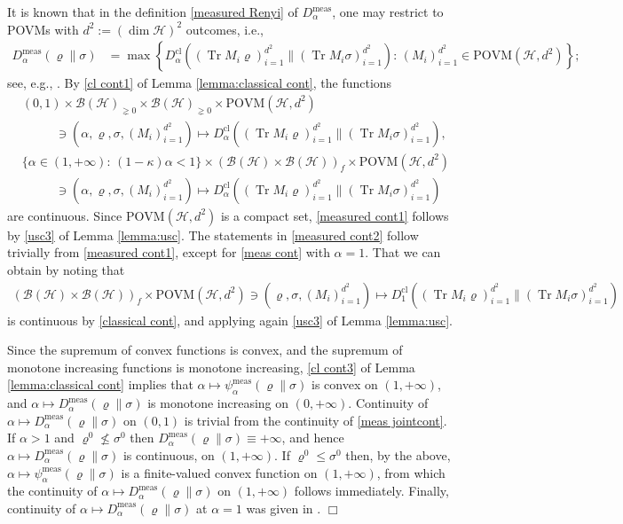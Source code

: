 \documentclass[unsortedaddress,superscriptaddress,pra,notitlepage]{revtex4}
\newenvironment{proof}[1][Proof]{\begin{trivlist}
\item[\hskip \labelsep {\bfseries #1}]}{\hfill$\Box$\end{trivlist}}
\def\B{{\mathcal B}}
\def\rho{\varrho}
\def\hil{{\mathcal H}}
\def\bz{\left(}
\def\jz{\right)}
\def\povm{\mathrm{POVM}}
\def\meas{\mathrm{meas}}
\def\pne{_{\gneq 0}}
\def\cl{\mathrm{cl}}
\def\cl{\mathrm{cl}}
\def\pwr{\kappa}
\newcommand{\ds}{\mbox{ }\mbox{ }}
\DeclareMathOperator{\Tr}{Tr}
\begin{document}
\begin{proof}
It is known that in the definition \eqref{measured Renyi} of $D_{\alpha}^{\meas}$, 
one may restrict to POVMs with $d^2:=(\dim\hil)^2$ outcomes, i.e., 
\begin{align*}
D_{\alpha}^{\meas}(\rho\|\sigma)&=
\max\left\{D_{\alpha}^{\cl}\bz(\Tr M_i\rho)_{i=1}^{d^2}\big\|(\Tr M_i\sigma)_{i=1}^{d^2}\jz:\,
(M_i)_{i=1}^{d^2}\in\povm(\hil,d^2)\right\};
\end{align*}
see, e.g., \cite[Lemma 4.14]{HiaiMosonyi2017}. 
By \ref{cl cont1} of Lemma \ref{lemma:classical cont}, the functions
\begin{align*}
&(0,1)\times\B(\hil)\pne\times\B(\hil)\pne\times\povm(\hil,d^2)\\
&\ds\ds\ni\bz\alpha,\rho,\sigma,(M_i)_{i=1}^{d^2}\jz\mapsto 
D_{\alpha}^{\cl}\bz(\Tr M_i\rho)_{i=1}^{d^2}\big\|(\Tr M_i\sigma)_{i=1}^{d^2}\jz,\\
&\{\alpha\in(1,+\infty):\,(1-\pwr)\alpha<1\}\times\bz\B(\hil)\times\B(\hil)\jz_{f}\times\povm(\hil,d^2)\\
&\ds\ds\ni\bz\alpha,\rho,\sigma,(M_i)_{i=1}^{d^2}\jz\mapsto 
D_{\alpha}^{\cl}\bz(\Tr M_i\rho)_{i=1}^{d^2}\big\|(\Tr M_i\sigma)_{i=1}^{d^2}\jz
\end{align*}
are continuous. Since $\povm(\hil,d^2)$ is a compact set, \ref{measured cont1} follows
by \ref{usc3} of Lemma \ref{lemma:usc}. The statements in \ref{measured cont2}
follow trivially from \ref{measured cont1}, except for \eqref{meas cont} with $\alpha=1$.
That we can obtain by noting that 
\begin{align*}
\bz\B(\hil)\times\B(\hil)\jz_{f}\times\povm(\hil,d^2)
\ni\bz\rho,\sigma,(M_i)_{i=1}^{d^2}\jz\mapsto 
D_{1}^{\cl}\bz(\Tr M_i\rho)_{i=1}^{d^2}\big\|(\Tr M_i\sigma)_{i=1}^{d^2}\jz
\end{align*}
is continuous by \eqref{classical cont}, and applying again \ref{usc3} of Lemma \ref{lemma:usc}.

Since the supremum of convex functions is convex, and the supremum of monotone increasing functions is monotone increasing,  \ref{cl cont3} of Lemma \ref{lemma:classical cont} implies that 
$\alpha\mapsto\psi_{\alpha}^{\meas}(\rho\|\sigma)$ 
is convex on $(1,+\infty)$, and 
$\alpha\mapsto D_{\alpha}^{\meas}(\rho\|\sigma)$ 
is monotone increasing on $(0,+\infty)$.
Continuity of $\alpha\mapsto D_{\alpha}^{\meas}(\rho\|\sigma)$ on $(0,1)$ is trivial from 
the continuity of \eqref{meas jointcont}.
If $\alpha>1$ and $\rho^0\nleq\sigma^0$ then $D_{\alpha}^{\meas}(\rho\|\sigma)\equiv +\infty$, and hence 
$\alpha\mapsto D_{\alpha}^{\meas}(\rho\|\sigma)$ is continuous, on $(1,+\infty)$.
If $\rho^0\le\sigma^0$ then, by the above, 
$\alpha\mapsto \psi_{\alpha}^{\meas}(\rho\|\sigma)$ is a finite-valued convex function
on $(1,+\infty)$,  
from which the continuity of $\alpha\mapsto D_{\alpha}^{\meas}(\rho\|\sigma)$
on $(1,+\infty)$ follows immediately. 
Finally, continuity of  $\alpha\mapsto D_{\alpha}^{\meas}(\rho\|\sigma)$ at $\alpha=1$
was given in \cite[Proposition III.32]{MH-testdiv}.
\end{proof}
\end{document}
